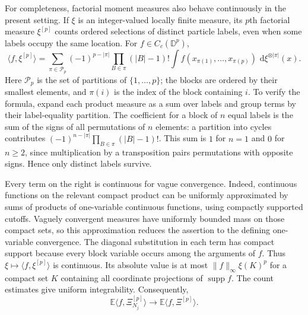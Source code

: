 \documentclass[11pt,a4paper]{article}
\numberwithin{equation}{section}
\theoremstyle{definition}
\theoremstyle{remark}
\newcommand{\D}{\mathbb D}
\newcommand{\E}{\mathbb E}
\newcommand{\dd}{\,\mathrm d}
\begin{document}
For completeness, factorial moment measures also behave continuously
in the present setting.  If $\xi$ is an integer-valued locally finite
measure, its $p$th factorial measure $\xi^{[p]}$ counts ordered
selections of distinct particle labels, even when some labels occupy
the same location.  For $f\in C_c(\D^p)$,
\begin{equation}
 \langle f,\xi^{[p]}\rangle
 =\sum_{\pi\in\mathcal P_p}
 (-1)^{p-|\pi|}\prod_{B\in\pi}(|B|-1)!
 \int f(x_{\pi(1)},\ldots,x_{\pi(p)})
        \,\dd\xi^{\otimes|\pi|}(x).
 \label{hier:partition-formula}
\end{equation}
Here $\mathcal P_p$ is the set of partitions of $\{1,\ldots,p\}$;
the blocks are ordered by their smallest elements, and $\pi(i)$ is
the index of the block containing $i$. To verify the formula, expand
each product measure as a sum over labels and group terms by their
label-equality partition. The coefficient for a block of $n$ equal
labels is the sum of the signs of all permutations of $n$ elements:
a partition into cycles contributes
$(-1)^{n-|\pi|}\prod_{B\in\pi}(|B|-1)!$. This sum is $1$ for $n=1$
and $0$ for $n\geq2$, since multiplication by a transposition pairs
permutations with opposite signs. Hence only distinct labels survive.

Every term on the right is continuous for vague convergence. Indeed,
continuous functions on the relevant compact product can be uniformly
approximated by sums of products of one-variable continuous functions,
using compactly supported cutoffs. Vaguely convergent measures have
uniformly bounded mass on those compact sets, so this approximation
reduces the assertion to the defining one-variable convergence. The
diagonal substitution in each term has compact support because every
block variable occurs among the arguments of $f$. Thus
$\xi\mapsto\langle f,\xi^{[p]}\rangle$ is continuous.  Its absolute
value is at most $\|f\|_\infty\xi(K)^p$ for a compact set $K$
containing all coordinate projections of $\operatorname{supp}f$.
The count estimates give uniform integrability.  Consequently,
\begin{equation}
 \E\langle f,\Xi_{N_j}^{[p]}\rangle
 \longrightarrow\E\langle f,\Xi^{[p]}\rangle.
 \label{hier:factorial-moment-convergence}
\end{equation}
\end{document}
